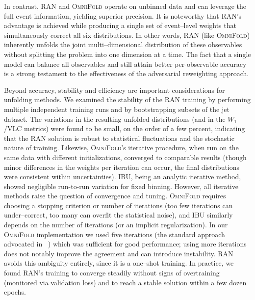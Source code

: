             In contrast, RAN and \textsc{OmniFold} operate on unbinned data and can leverage the full event information, yielding superior precision.
            It is noteworthy that RAN’s advantage is achieved while producing a single set of event--level weights that simultaneously correct all six distributions.
            In other words, RAN (like \textsc{OmniFold}) inherently unfolds the joint multi--dimensional distribution of these observables without splitting the problem into one dimension at a time.
            The fact that a single model can balance all observables and still attain better per-observable accuracy is a strong testament to the effectiveness of the adversarial reweighting approach.

            Beyond accuracy, stability and efficiency are important considerations for unfolding methods.
            We examined the stability of the RAN training by performing multiple independent training runs and by bootstrapping subsets of the jet dataset.
            The variations in the resulting unfolded distributions (and in the $W_1$/VLC metrics) were found to be small, on the order of a few percent, indicating that the RAN solution is robust to statistical fluctuations and the stochastic nature of training.
            Likewise, \textsc{OmniFold}’s iterative procedure, when run on the same data with different initializations, converged to comparable results (though minor differences in the weights per iteration can occur, the final distributions were consistent within uncertainties).
            IBU, being an analytic iterative method, showed negligible run-to-run variation for fixed binning.
            However, all iterative methods raise the question of convergence and tuning.
            \textsc{OmniFold} requires choosing a stopping criterion or number of iterations (too few iterations can under--correct, too many can overfit the statistical noise), and IBU similarly depends on the number of iterations (or an implicit regularization).
            In our \textsc{OmniFold} implementation we used five iterations (the standard approach advocated in ~) which was sufficient for good performance; using more iterations does not notably improve the agreement and can introduce instability.
            RAN avoids this ambiguity entirely, since it is a one--shot training.
            In practice, we found RAN’s training to converge steadily without signs of overtraining (monitored via validation loss) and to reach a stable solution within a few dozen epochs.
